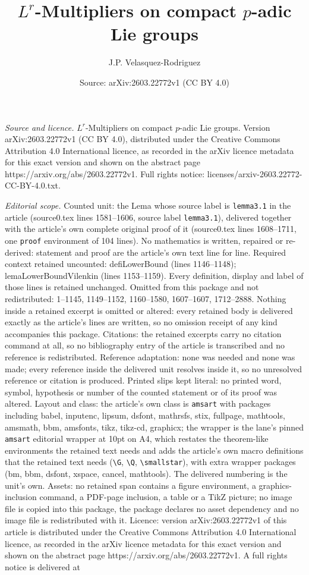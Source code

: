 \documentclass[10pt,a4paper]{amsart}
\title[$L^r$-Multipliers on compact $p$-adic Lie groups]{$L^r$-Multipliers on compact $p$-adic Lie groups}
\author{J.P. Velasquez-Rodriguez}
\date{Source: arXiv:2603.22772v1 (CC BY 4.0)}
\begin{document}
\maketitle

\noindent\emph{Source and licence.} $L^r$-Multipliers on compact $p$-adic Lie groups. Version arXiv:2603.22772v1 (CC BY 4.0), distributed under the Creative Commons Attribution 4.0 International licence, as recorded in the arXiv licence metadata for this exact version and shown on the abstract page https://arxiv.org/abs/2603.22772v1. Full rights notice: licenses/arxiv-2603.22772-CC-BY-4.0.txt.\par\smallskip

\noindent\textit{Editorial scope.} Counted unit: the Lema whose source label is \texttt{lemma3.1} in the article (source0.tex lines 1581--1606, source label \texttt{lemma3.1}), delivered together with the article's own complete original proof of it (source0.tex lines 1608--1711, one \texttt{proof} environment of 104 lines). No mathematics is written, repaired or re-derived: statement and proof are the article's own text line for line. Required context retained uncounted: defiLowerBound (lines 1146--1148); lemaLowerBoundVilenkin (lines 1153--1159). Every definition, display and label of those lines is retained unchanged. Omitted from this package and not redistributed: 1--1145, 1149--1152, 1160--1580, 1607--1607, 1712--2888. Nothing inside a retained excerpt is omitted or altered: every retained body is delivered exactly as the article's lines are written, so no omission receipt of any kind accompanies this package. Citations: the retained excerpts carry no citation command at all, so no bibliography entry of the article is transcribed and no reference is redistributed. Reference adaptation: none was needed and none was made; every reference inside the delivered unit resolves inside it, so no unresolved reference or citation is produced. Printed slips kept literal: no printed word, symbol, hypothesis or number of the counted statement or of its proof was altered. Layout and class: the article's own class is \texttt{amsart} with packages including babel, inputenc, lipsum, dsfont, mathrsfs, stix, fullpage, mathtools, amsmath, bbm, amsfonts, tikz, tikz-cd, graphicx; the wrapper is the lane's pinned \texttt{amsart} editorial wrapper at 10pt on A4, which restates the theorem-like environments the retained text needs and adds the article's own macro definitions that the retained text needs (\texttt{\textbackslash G}, \texttt{\textbackslash Q}, \texttt{\textbackslash smallstar}), with extra wrapper packages (bm, bbm, dsfont, xspace, cancel, mathtools). The delivered numbering is the unit's own. Assets: no retained span contains a figure environment, a graphics-inclusion command, a PDF-page inclusion, a table or a TikZ picture; no image file is copied into this package, the package declares no asset dependency and no image file is redistributed with it. Licence: version arXiv:2603.22772v1 of this article is distributed under the Creative Commons Attribution 4.0 International licence, as recorded in the arXiv licence metadata for this exact version and shown on the abstract page https://arxiv.org/abs/2603.22772v1. A full rights notice is delivered at 
\end{document}
